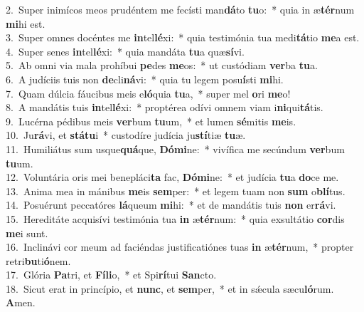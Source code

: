 {2.~}Super inimícos meos prudéntem me fecísti man\textbf{dá}to \textbf{tu}o:~* quia in æ\textbf{tér}num \textbf{mi}hi est.\\
{3.~}Super omnes docéntes me \textbf{in}tel\textbf{lé}xi:~* quia testimónia tua medi\textbf{tá}tio \textbf{me}a est.\\
{4.~}Super senes \textbf{in}tel\textbf{lé}xi:~* quia mandáta \textbf{tu}a quæ\textbf{sí}vi.\\
{5.~}Ab omni via mala prohíbui \textbf{pe}des \textbf{me}os:~* ut custódiam \textbf{ver}ba \textbf{tu}a.\\
{6.~}A judíciis tuis non \textbf{de}cli\textbf{ná}vi:~* quia tu legem posu\textbf{í}sti \textbf{mi}hi.\\
{7.~}Quam dúlcia fáucibus meis e\textbf{ló}quia \textbf{tu}a,~* super mel \textbf{o}ri \textbf{me}o!\\
{8.~}A mandátis tuis \textbf{in}tel\textbf{lé}xi:~* proptérea odívi omnem viam i\textbf{ni}qui\textbf{tá}tis.\\
{9.~}Lucérna pédibus meis \textbf{ver}bum \textbf{tu}um,~* et lumen \textbf{sé}mitis \textbf{me}is.\\
{10.~}Ju\textbf{rá}vi, et \textbf{stá}\textbf{tu}i~* custodíre judícia ju\textbf{stí}tiæ \textbf{tu}æ.\\
{11.~}Humiliátus sum usque\textbf{quá}que, \textbf{Dó}\textbf{mi}ne:~* vivífica me secúndum \textbf{ver}bum \textbf{tu}um.\\
{12.~}Voluntária oris mei benepláci\textbf{ta} fac, \textbf{Dó}\textbf{mi}ne:~* et judícia \textbf{tu}a \textbf{do}ce me.\\
{13.~}Anima mea in mánibus \textbf{me}is \textbf{sem}per:~* et legem tuam non \textbf{sum} o\textbf{blí}tus.\\
{14.~}Posuérunt peccatóres \textbf{lá}queum \textbf{mi}hi:~* et de mandátis tuis \textbf{non} er\textbf{rá}vi.\\
{15.~}Hereditáte acquisívi testimónia tua \textbf{in} æ\textbf{tér}num:~* quia exsultátio \textbf{cor}dis \textbf{me}i sunt.\\
{16.~}Inclinávi cor meum ad faciéndas justificatiónes tuas \textbf{in} æ\textbf{tér}num,~* propter retri\textbf{bu}ti\textbf{ó}nem.\\
{17.~}Glória \textbf{Pa}tri, et \textbf{Fí}\textbf{li}o,~* et Spi\textbf{rí}tui \textbf{San}cto.\\
{18.~}Sicut erat in princípio, et \textbf{nunc}, et \textbf{sem}per,~* et in sǽcula sæcu\textbf{ló}rum. \textbf{A}men.\\
